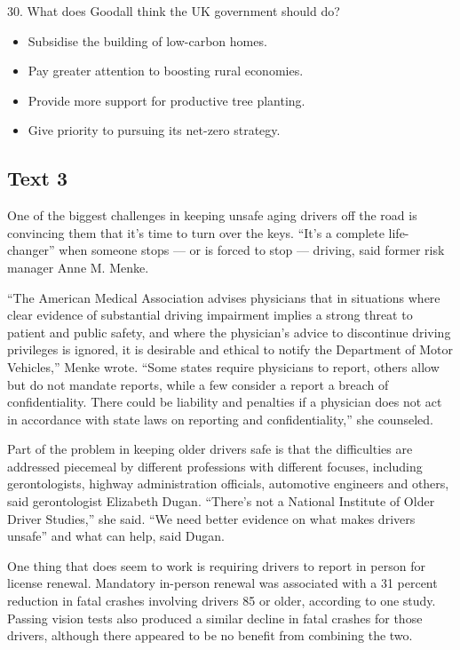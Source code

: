 \documentclass[UTF8,11pt]{ctexart}
\begin{document}
30. What does Goodall think the UK government should do?


\begin{itemize}[leftmargin=2em,itemsep=.2em,topsep=.4em]\item[A.] Subsidise the building of low-carbon homes.
\item[B.] Pay greater attention to boosting rural economies.
\item[C.] Provide more support for productive tree planting.
\item[D.] Give priority to pursuing its net-zero strategy.
\end{itemize}

\subsection*{\textbf{Text 3}}


One of the biggest challenges in keeping unsafe aging drivers off the road is convincing them that it’s time to turn over the keys. “It’s a complete life-changer” when someone stops — or is forced to stop — driving, said former risk manager Anne M. Menke.


“The American Medical Association advises physicians that in situations where clear evidence of substantial driving impairment implies a strong threat to patient and public safety, and where the physician’s advice to discontinue driving privileges is ignored, it is desirable and ethical to notify the Department of Motor Vehicles,” Menke wrote. “Some states require physicians to report, others allow but do not mandate reports, while a few consider a report a breach of confidentiality. There could be liability and penalties if a physician does not act in accordance with state laws on reporting and confidentiality,” she counseled.


Part of the problem in keeping older drivers safe is that the difficulties are addressed piecemeal by different professions with different focuses, including gerontologists, highway administration officials, automotive engineers and others, said gerontologist Elizabeth Dugan. “There’s not a National Institute of Older Driver Studies,” she said. “We need better evidence on what makes drivers unsafe” and what can help, said Dugan.


One thing that does seem to work is requiring drivers to report in person for license renewal. Mandatory in-person renewal was associated with a 31 percent reduction in fatal crashes involving drivers 85 or older, according to one study. Passing vision tests also produced a similar decline in fatal crashes for those drivers, although there appeared to be no benefit from combining the two.
\end{document}
